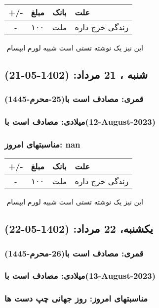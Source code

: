 \documentclass{article}
\newcommand{\rnote}[1]{\marginpar{\textcolor{color}{\StrSubstitute{\##1}{ }{\_}}}}
\newcommand{\myRow}[4]{
    #1 & #2 & #3 & #4 \\ \hline
}
\begin{document}
\begin{tabular}{ | c | c | c | p{5cm} |}
    \hline
    \myRow{ +/- }{مبلغ}{بانک}{علت}
    \myRow{-}{۱۰۰}{ملت}{زندگی خرج داره}
\end{tabular}
\newline
\newline

‌
\rnote{تست}
این نیز یک نوشته تستی است شبیه لورم ایپسام




\newpage
{}
\textcolor{color}{
\section{ شنبه ، 21 مرداد: (1402-05-21) }
\subsubsection*{قمری: مصادف است با(25-محرم-1445)} 
\subsubsection*{میلادی: مصادف است با(12-August-2023)}
\subsubsection*{مناسبتهای امروز: nan}
}


\begin{tabular}{ | c | c | c | p{5cm} |}
    \hline
    \myRow{ +/- }{مبلغ}{بانک}{علت}
    \myRow{-}{۱۰۰}{ملت}{زندگی خرج داره}
\end{tabular}
\newline
\newline

‌
\rnote{تست}
این نیز یک نوشته تستی است شبیه لورم ایپسام




\newpage
{}
\textcolor{color}{
\section{ یکشنبه، 22 مرداد: (1402-05-22) }
\subsubsection*{قمری: مصادف است با(26-محرم-1445)} 
\subsubsection*{میلادی: مصادف است با(13-August-2023)}
\subsubsection*{مناسبتهای امروز: روز جهانی چپ دست ها}
}
\end{document}
